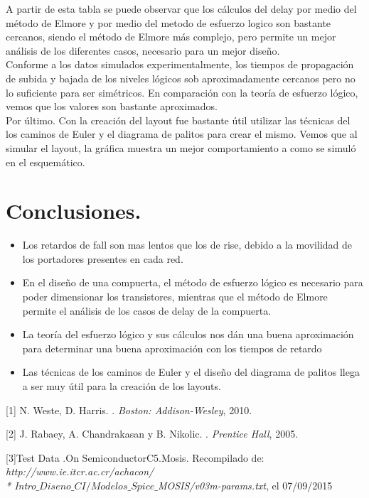 \documentclass[12pt,a4paper]{article} %
\begin{document}
A partir de esta tabla se puede observar que los cálculos del delay por medio del método de Elmore y por medio del metodo de esfuerzo logico son bastante cercanos, siendo el método de Elmore más complejo, pero permite un mejor análisis de los diferentes casos, necesario para un mejor diseño.\\

Conforme a los datos simulados experimentalmente, los tiempos de propagación de subida y bajada de los niveles lógicos sob aproximadamente cercanos pero no lo suficiente para ser simétricos. En comparación con la teoría de esfuerzo lógico, vemos que los valores son bastante aproximados.\\

Por último. Con la creación del layout fue bastante útil utilizar las técnicas del los caminos de Euler y el diagrama de palitos para crear el mismo. Vemos que al simular el layout, la gráfica muestra un mejor comportamiento a como se simuló en el esquemático.




\section{Conclusiones.}
\begin{itemize}
\item Los retardos de fall son mas lentos que los de rise, debido a la movilidad de los portadores presentes en cada red.
\item En el diseño de una compuerta, el método de esfuerzo lógico es necesario para poder dimensionar los transistores, mientras que el método de Elmore permite el análisis de los casos de delay de la compuerta.
\item La teoría del esfuerzo lógico y sus cálculos nos dán una buena aproximación para determinar una buena aproximación con los tiempos de retardo
\item Las técnicas de los caminos de Euler y el diseño del diagrama de palitos llega a ser muy útil para la creación de los layouts.

\end{itemize}

\begin{thebibliography}{3}


[1] N. Weste, D. Harris. 
.
\newblock \emph{Boston: Addison-Wesley}, 2010.

[2] J. Rabaey, A. Chandrakasan y B. Nikolic. 
.
\newblock \emph{Prentice Hall}, 2005.

[3]Test Data .On SemiconductorC5.Mosis. Recompilado de:
\newblock \emph{http://www.ie.itcr.ac.cr/achacon/ \\* Intro$\_Diseno\_CI/Modelos\_Spice\_$MOSIS/v03m-params.txt}, el 07/09/2015

\end{thebibliography}
\end{document}
